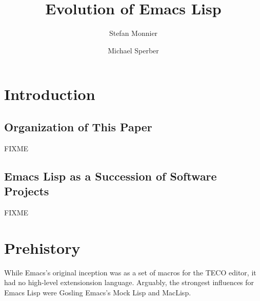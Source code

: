 \documentclass[format=acmsmall, review=false, screen=true]{acmart}
\begin{document}
\title{Evolution of Emacs Lisp}

\author{Stefan Monnier}
\author{Michael Sperber}





%
%




\maketitle

\section{Introduction}

\subsection{Organization of This Paper}

FIXME

\subsection{Emacs Lisp as a Succession of Software Projects}

FIXME

\section{Prehistory}


While Emacs's original inception was as a set of macros for the TECO
editor, it had no high-level extensionsion language.  Arguably, the
strongest influences for Emacs Lisp were Gosling Emacs's Mock Lisp and
MacLisp.
\end{document}
